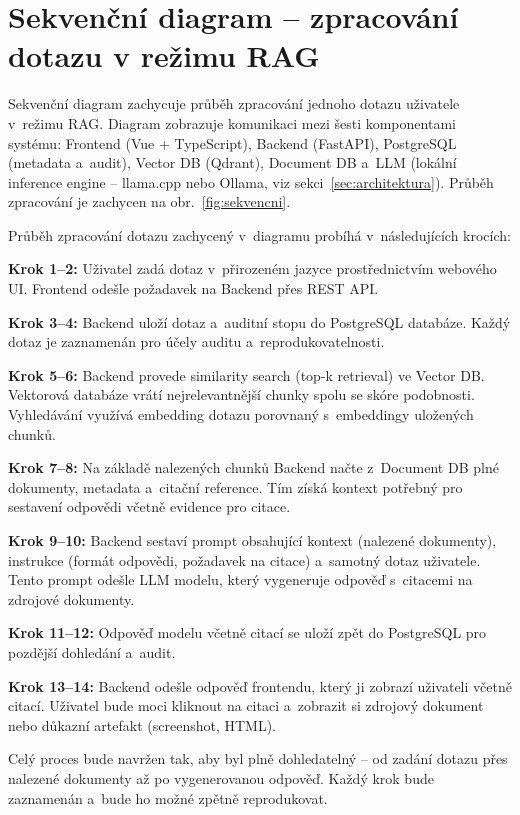 \documentclass[a4paper, 11pt]{article}
\begin{document}
\section{Sekvenční diagram -- zpracování dotazu v režimu RAG}

Sekvenční diagram zachycuje průběh zpracování jednoho dotazu uživatele v~režimu RAG. Diagram zobrazuje komunikaci mezi šesti komponentami systému: Frontend (Vue + TypeScript), Backend (FastAPI), PostgreSQL (metadata a~audit), Vector DB (Qdrant), Document DB a~LLM (lokální inference engine -- llama.cpp nebo Ollama, viz sekci~\ref{sec:architektura}). Průběh zpracování je zachycen na obr.~\ref{fig:sekvencni}.

Průběh zpracování dotazu zachycený v~diagramu probíhá v~následujících krocích:

\textbf{Krok 1--2:} Uživatel zadá dotaz v~přirozeném jazyce prostřednictvím webového UI. Frontend odešle požadavek na Backend přes REST API.

\textbf{Krok 3--4:} Backend uloží dotaz a~auditní stopu do PostgreSQL databáze. Každý dotaz je zaznamenán pro účely auditu a~reprodukovatelnosti.

\textbf{Krok 5--6:} Backend provede similarity search (top-k retrieval) ve Vector DB. Vektorová databáze vrátí nejrelevantnější chunky spolu se skóre podobnosti. Vyhledávání využívá embedding dotazu porovnaný s~embeddingy uložených chunků.

\textbf{Krok 7--8:} Na základě nalezených chunků Backend načte z~Document DB plné dokumenty, metadata a~citační reference. Tím získá kontext potřebný pro sestavení odpovědi včetně evidence pro citace.

\textbf{Krok 9--10:} Backend sestaví prompt obsahující kontext (nalezené dokumenty), instrukce (formát odpovědi, požadavek na citace) a~samotný dotaz uživatele. Tento prompt odešle LLM modelu, který vygeneruje odpověď s~citacemi na zdrojové dokumenty.

\textbf{Krok 11--12:} Odpověď modelu včetně citací se uloží zpět do PostgreSQL pro pozdější dohledání a~audit.

\textbf{Krok 13--14:} Backend odešle odpověď frontendu, který ji zobrazí uživateli včetně citací. Uživatel bude moci kliknout na citaci a~zobrazit si zdrojový dokument nebo důkazní artefakt (screenshot, HTML).

Celý proces bude navržen tak, aby byl plně dohledatelný -- od zadání dotazu přes nalezené dokumenty až po vygenerovanou odpověď. Každý krok bude zaznamenán a~bude ho možné zpětně reprodukovat.
\end{document}
